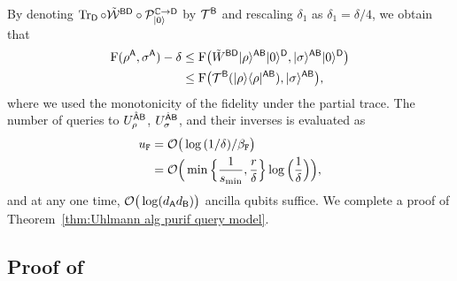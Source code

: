 By denoting $\operatorname{Tr}_{{\mathsf{D}}}\circ\tilde{{\mathcal{W}}}^{{\mathsf{B}}{\mathsf{D}}}\circ{\mathcal{P}}_{|0\rangle}^{\mathbb{C}\rightarrow{\mathsf{D}}}$ by ${\mathcal{T}}^{\mathsf{B}}$ and rescaling $\delta_1$ as $\delta_1 = \delta/4$, we obtain that
\begin{align}
    {\mathrm{F}}(\rho^{\mathsf{A}}, \sigma^{\mathsf{A}}) - \delta 
    &\leq {\mathrm{F}}\big(\tilde{W}^{{\mathsf{B}}{\mathsf{D}}}|\rho\rangle^{{\mathsf{A}}{\mathsf{B}}}|0\rangle^{{\mathsf{D}}}, |\sigma\rangle^{{\mathsf{A}}{\mathsf{B}}}|0\rangle^{{\mathsf{D}}}\big) \\
    &\leq {\mathrm{F}}\big({\mathcal{T}}^{\mathsf{B}}(|\rho\rangle\langle\rho|^{{\mathsf{A}}{\mathsf{B}}}), |\sigma\rangle^{{\mathsf{A}}{\mathsf{B}}}\big),
\end{align}
where we used the monotonicity of the fidelity under the partial trace. 
The number of queries to $U_\rho^{\hat{{\mathsf{A}}}{\mathsf{B}}}$, $U_\sigma^{\hat{{\mathsf{A}}}{\mathsf{B}}}$, and their inverses is evaluated as
\begin{align}
    u_{\mathtt{F}} &= {\mathcal{O}}\big(\log{(1/\delta)}/\beta_{\mathtt{F}}\big) \\
    &= {\mathcal{O}}\Big(\min\Big\{\frac{1}{s_{\rm min}}, \frac{r}{\delta}\Big\}\log{\Big(\frac{1}{\delta}\Big)}\Big),
\end{align}
and at any one time, ${\mathcal{O}}\big(\log(d_{\mathsf{A}} d_{\mathsf{B}})\big)$ ancilla qubits suffice.
We complete a proof of Theorem~\ref{thm:Uhlmann alg purif query model}.














\subsection{Proof of }
\label{sec:proof of lem FPAA diamond}




